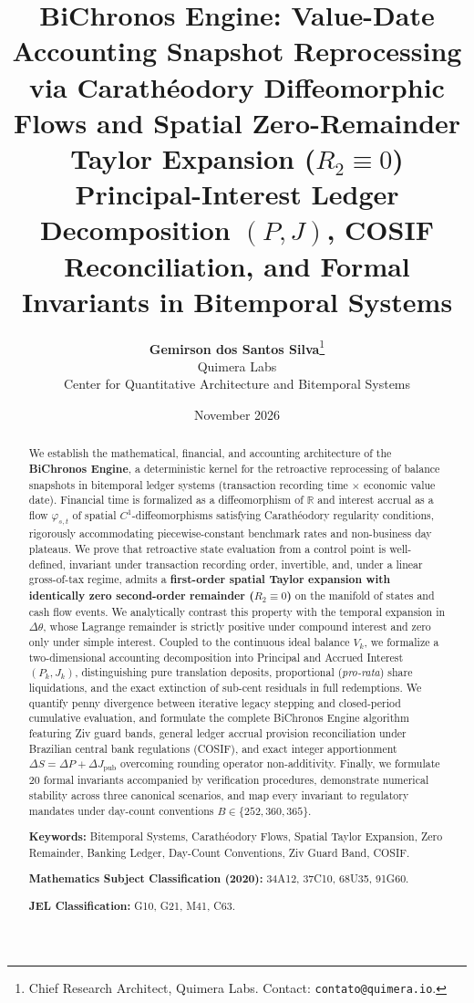 \documentclass[11pt, a4paper]{article}
\title{\textbf{BiChronos Engine: Value-Date Accounting Snapshot Reprocessing via Carathéodory Diffeomorphic Flows and Spatial Zero-Remainder Taylor Expansion (\texorpdfstring{$R_2 \equiv 0$}{R2 = 0})}\\[0.3em]\large Principal-Interest Ledger Decomposition \texorpdfstring{$(P, J)$}{(P, J)}, COSIF Reconciliation, and Formal Invariants in Bitemporal Systems}
\author{\textbf{Gemirson dos Santos Silva}\thanks{Chief Research Architect, Quimera Labs. Contact: \texttt{contato@quimera.io}.}\\[0.2em]
\normalsize Quimera Labs\\\small Center for Quantitative Architecture and Bitemporal Systems}
\date{November 2026}
\theoremstyle{definition}
\theoremstyle{plain}
\theoremstyle{remark}
\begin{document}
\maketitle

\begin{abstract}
\noindent We establish the mathematical, financial, and accounting architecture of the \textbf{BiChronos Engine}, a deterministic kernel for the retroactive reprocessing of balance snapshots in bitemporal ledger systems (transaction recording time $\times$ economic value date). Financial time is formalized as a diffeomorphism of $\mathbb{R}$ and interest accrual as a flow $\varphi_{s,t}$ of spatial $C^1$-diffeomorphisms satisfying Carathéodory regularity conditions, rigorously accommodating piecewise-constant benchmark rates and non-business day plateaus. We prove that retroactive state evaluation from a control point is well-defined, invariant under transaction recording order, invertible, and, under a linear gross-of-tax regime, admits a \textbf{first-order spatial Taylor expansion with identically zero second-order remainder ($R_2 \equiv 0$)} on the manifold of states and cash flow events. We analytically contrast this property with the temporal expansion in $\Delta\theta$, whose Lagrange remainder is strictly positive under compound interest and zero only under simple interest. Coupled to the continuous ideal balance $V_k$, we formalize a two-dimensional accounting decomposition into Principal and Accrued Interest $(P_k, J_k)$, distinguishing pure translation deposits, proportional (\emph{pro-rata}) share liquidations, and the exact extinction of sub-cent residuals in full redemptions. We quantify penny divergence between iterative legacy stepping and closed-period cumulative evaluation, and formulate the complete BiChronos Engine algorithm featuring Ziv guard bands, general ledger accrual provision reconciliation under Brazilian central bank regulations (COSIF), and exact integer apportionment $\Delta S = \Delta P + \Delta J_{\text{pub}}$ overcoming rounding operator non-additivity. Finally, we formulate 20 formal invariants accompanied by verification procedures, demonstrate numerical stability across three canonical scenarios, and map every invariant to regulatory mandates under day-count conventions $B \in \{252, 360, 365\}$.

\vspace{0.8em}
\noindent\textbf{Keywords:} Bitemporal Systems, Carathéodory Flows, Spatial Taylor Expansion, Zero Remainder, Banking Ledger, Day-Count Conventions, Ziv Guard Band, COSIF.

\vspace{0.4em}
\noindent\textbf{Mathematics Subject Classification (2020):} 34A12, 37C10, 68U35, 91G60.

\vspace{0.2em}
\noindent\textbf{JEL Classification:} G10, G21, M41, C63.
\end{abstract}
\end{document}
